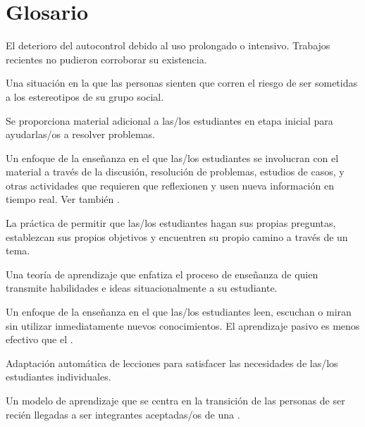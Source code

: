 \chapter{Glosario}\label{s:gloss}

\begin{description}

 El deterioro del autocontrol debido al uso prolongado o intensivo.
Trabajos recientes no pudieron corroborar su existencia.

 Una situación en la que las personas sienten que corren el riesgo de ser sometidas a los estereotipos de su grupo social.

 Se proporciona material adicional a las/los estudiantes
en etapa inicial para ayudarlas/os a resolver problemas.

 Un enfoque de la enseñanza en el que
las/los estudiantes se involucran con el material a través de la discusión, resolución de problemas, estudios de casos,
y otras actividades que requieren que reflexionen y usen nueva información en
tiempo real. Ver también .

 La práctica de permitir que 
las/los estudiantes hagan sus propias preguntas, establezcan sus propios objetivos y encuentren su propio camino a través de un tema.

 Una teoría de
aprendizaje que enfatiza el proceso de enseñanza de quien transmite habilidades e ideas
situacionalmente a su estudiante.

 Un enfoque de la enseñanza en el que las/los 
estudiantes leen, escuchan o miran sin utilizar inmediatamente nuevos conocimientos. 
El aprendizaje pasivo es menos efectivo que el .

 Adaptación automática de lecciones para 
satisfacer las necesidades de las/los estudiantes individuales.

 Un modelo de aprendizaje que se centra en la transición de 
las personas de ser recién llegadas a ser integrantes aceptadas/os de una
.


\end{description}
